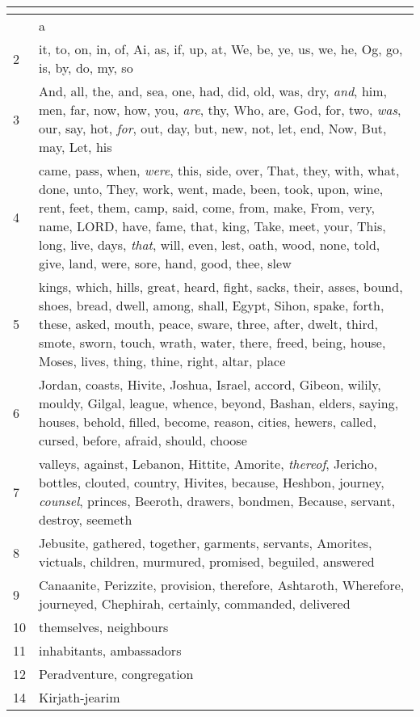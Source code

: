 \begin{center}
\begin{longtable}{l|p{3.75in}}
\hline \multicolumn{2}{c}{{ }} \\ \hline
\endfoot 
1 & a\\ \hline 
2 & it, to, on, in, of, Ai, as, if, up, at, We, be, ye, us, we, he, Og, go, is, by, do, my, so\\ \hline 
3 & And, all, the, and, sea, one, had, did, old, was, dry, \emph{and}, him, men, far, now, how, you, \emph{are}, thy, Who, are, God, for, two, \emph{was}, our, say, hot, \emph{for}, out, day, but, new, not, let, end, Now, But, may, Let, his\\ \hline 
4 & came, pass, when, \emph{were}, this, side, over, That, they, with, what, done, unto, They, work, went, made, been, took, upon, wine, rent, feet, them, camp, said, come, from, make, From, very, name, LORD, have, fame, that, king, Take, meet, your, This, long, live, days, \emph{that}, will, even, lest, oath, wood, none, told, give, land, were, sore, hand, good, thee, slew\\ \hline 
5 & kings, which, hills, great, heard, fight, sacks, their, asses, bound, shoes, bread, dwell, among, shall, Egypt, Sihon, spake, forth, these, asked, mouth, peace, sware, three, after, dwelt, third, smote, sworn, touch, wrath, water, there, freed, being, house, Moses, lives, thing, thine, right, altar, place\\ \hline 
6 & Jordan, coasts, Hivite, Joshua, Israel, accord, Gibeon, wilily, mouldy, Gilgal, league, whence, beyond, Bashan, elders, saying, houses, behold, filled, become, reason, cities, hewers, called, cursed, before, afraid, should, choose\\ \hline 
7 & valleys, against, Lebanon, Hittite, Amorite, \emph{thereof}, Jericho, bottles, clouted, country, Hivites, because, Heshbon, journey, \emph{counsel}, princes, Beeroth, drawers, bondmen, Because, servant, destroy, seemeth\\ \hline 
8 & Jebusite, gathered, together, garments, servants, Amorites, victuals, children, murmured, promised, beguiled, answered\\ \hline 
9 & Canaanite, Perizzite, provision, therefore, Ashtaroth, Wherefore, journeyed, Chephirah, certainly, commanded, delivered\\ \hline 
10 & themselves, neighbours\\ \hline 
11 & inhabitants, ambassadors\\ \hline 
12 & Peradventure, congregation\\ \hline 
14 & Kirjath-jearim\\ \hline 
\end{longtable}
\end{center}





